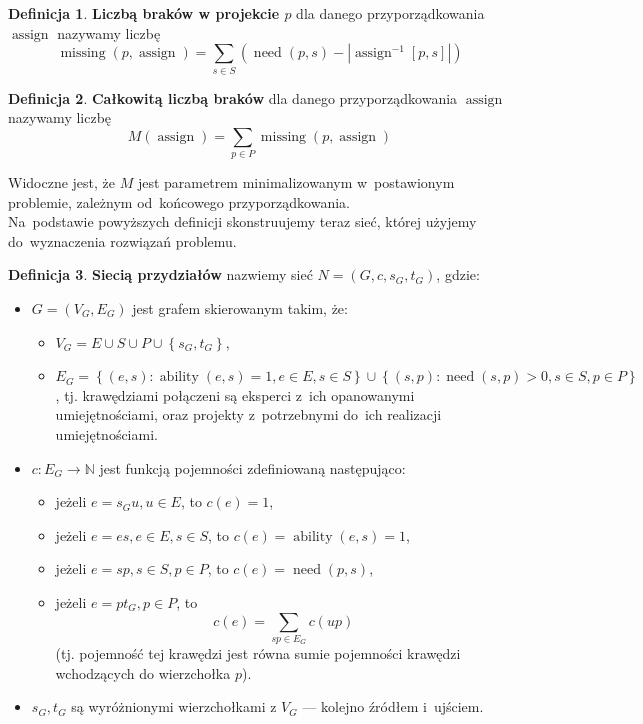 \documentclass[12pt,a4paper]{article}
\theoremstyle{definition}
\newtheorem{defn}{Definicja}
\DeclareMathOperator{\ability}{ability}
\DeclareMathOperator{\need}{need}
\DeclareMathOperator{\assign}{assign}
\DeclareMathOperator{\missing}{missing}
\begin{document}
\begin{defn}
\textbf{Liczbą braków w projekcie $p$} dla danego przyporządkowania $\assign$
nazywamy liczbę
$$ \missing(p,\assign) = \sum_{s \in S} \left( \need(p,s) -
\left| \assign^{-1}[p,s] \right| \right) $$
\end{defn}

\begin{defn}
\textbf{Całkowitą liczbą braków} dla danego przyporządkowania $\assign$ nazywamy
liczbę
$$ M(\assign) = \sum_{p \in P} \missing(p, \assign) $$
\end{defn}

\noindent
Widoczne jest, że $M$ jest parametrem minimalizowanym w~postawionym problemie,
zależnym od~końcowego przyporządkowania.\\

\noindent
Na~podstawie powyższych definicji skonstruujemy teraz sieć, której użyjemy
do~wyznaczenia rozwiązań problemu.

\begin{defn}
\textbf{Siecią przydziałów} nazwiemy sieć $N = \left(G,c,s_G,t_G\right)$, gdzie:
\begin{itemize}
	\item $G = \left(V_G,E_G\right)$ jest grafem skierowanym takim, że:
	\begin{itemize}
		\item $V_G = E \cup S \cup P \cup \left\lbrace s_G,t_G \right\rbrace$,
		\item $E_G = \left\lbrace (e,s) : \ability(e,s) = 1, e \in E, s \in S
		\right\rbrace \cup \left\lbrace (s,p) : \need(s,p) > 0, s \in S, p \in P
		\right\rbrace$, tj. krawędziami połączeni są eksperci z~ich opanowanymi
		umiejętnościami, oraz projekty z~potrzebnymi do~ich realizacji
		umiejętnościami.
	\end{itemize}
	\item $c : E_G \to \mathbb{N}$ jest funkcją pojemności zdefiniowaną
	następująco:
	\begin{itemize}
		\item jeżeli $e = s_G u, u \in E$, to $c(e) = 1$,
		\item jeżeli $e = es, e \in E, s \in S$, to $c(e) = \ability(e,s) = 1$,
		\item jeżeli $e = sp, s \in S, p \in P$, to $c(e) = \need(p,s)$,
		\item jeżeli $e = pt_G, p \in P$, to
		$$c(e) = \sum_{sp \in E_G} c(up)$$
		(tj. pojemność tej krawędzi jest równa sumie pojemności krawędzi
		wchodzących do wierzchołka $p$).
	\end{itemize}
	\item $s_G,t_G$ są wyróżnionymi wierzchołkami z $V_G$ --- kolejno źródłem
	i~ujściem.
\end{itemize}
\end{defn}
\end{document}
